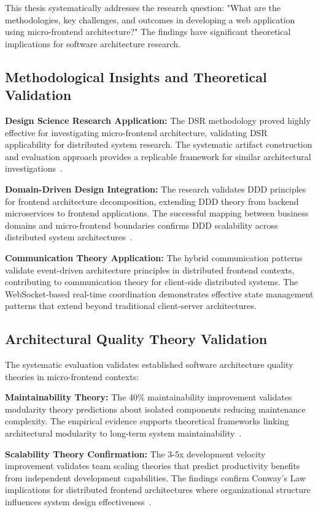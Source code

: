 \documentclass[12pt,a4paper]{report}
\begin{document}
This thesis systematically addresses the research question: "What are the methodologies, key challenges, and outcomes in developing a web application using micro-frontend architecture?" The findings have significant theoretical implications for software architecture research.

\subsection{Methodological Insights and Theoretical Validation}

\textbf{Design Science Research Application:} The DSR methodology proved highly effective for investigating micro-frontend architecture, validating DSR applicability for distributed system research. The systematic artifact construction and evaluation approach provides a replicable framework for similar architectural investigations~\cite{hevner2004design}.

\textbf{Domain-Driven Design Integration:} The research validates DDD principles for frontend architecture decomposition, extending DDD theory from backend microservices to frontend applications. The successful mapping between business domains and micro-frontend boundaries confirms DDD scalability across distributed system architectures~\cite{vernon2013implementing}.

\textbf{Communication Theory Application:} The hybrid communication patterns validate event-driven architecture principles in distributed frontend contexts, contributing to communication theory for client-side distributed systems. The WebSocket-based real-time coordination demonstrates effective state management patterns that extend beyond traditional client-server architectures.

\subsection{Architectural Quality Theory Validation}

The systematic evaluation validates established software architecture quality theories in micro-frontend contexts:

\textbf{Maintainability Theory:} The 40\% maintainability improvement validates modularity theory predictions about isolated components reducing maintenance complexity. The empirical evidence supports theoretical frameworks linking architectural modularity to long-term system maintainability~\cite{parnas1972criteria}.

\textbf{Scalability Theory Confirmation:} The 3-5x development velocity improvement validates team scaling theories that predict productivity benefits from independent development capabilities. The findings confirm Conway's Law implications for distributed frontend architectures where organizational structure influences system design effectiveness~\cite{conway1968committees}.
\end{document}
